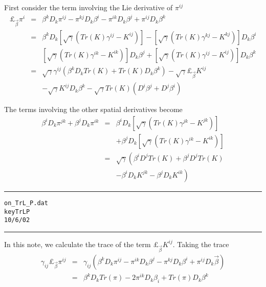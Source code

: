 \documentclass[12pt]{article}
\begin{document}
First consider the term involving the Lie derivative of $ {\pi}^{i j} $
\begin{eqnarray}\label{DxP1_1}
\pounds_{{\vec \beta}} {\pi}^{i }
& = &
{\beta}^{k} D_{k} {\pi}^{i j} - {\pi}^{k j} D_{k} {\beta}^{i}
- {\pi}^{i k} D_{k} {\beta}^{j} + {\pi}^{i j} D_{k} {\beta}^{k} \nonumber \\
& = &
{\beta}^{k} D_{k} \left[ \sqrt{\gamma} \left( Tr( K ) {\gamma}^{i j} - {K}^{i j} \right) \right]
- \left[ \sqrt{\gamma} \left( Tr( K ) {\gamma}^{k j} - {K}^{k j} \right) \right] D_{k} {\beta}^{i} \nonumber \\
&   &
\left[ \sqrt{\gamma} \left( Tr( K ) {\gamma}^{i k} - {K}^{i k} \right) \right] D_{k} {\beta}^{j}
+ \left[ \sqrt{\gamma} \left( Tr( K ) {\gamma}^{i j} - {K}^{i j} \right) \right] D_{k} {\beta}^{k} \nonumber \\
& = &
\sqrt{\gamma} {\gamma}^{i j} \left( {\beta}^{k} D_{k} Tr( K ) + Tr( K ) D_{k} {\beta}^{k} \right)
- \sqrt{\gamma} \pounds_{{\vec \beta}} {K}^{i j} \nonumber \\
&   &
- \sqrt{\gamma} {K}^{i j} D_{k} {\beta}^{k}
- \sqrt{\gamma} Tr( K ) \left( D^{i} {\beta}^{j} + D^{j} {\beta}^{i} \right)
\end{eqnarray}

The terms involving the other spatial derivatives become
\begin{eqnarray}\label{DxP1_2}
{\beta}^{i} D_{k} {\pi}^{j k} + {\beta}^{j} D_{k} {\pi}^{i k}
& = &
{\beta}^{i} D_{k} \left[ \sqrt{\gamma} \left( Tr( K ) {\gamma}^{j k} - {K}^{j k} \right) \right] \nonumber \\
&   &
+ {\beta}^{j} D_{k} \left[ \sqrt{\gamma} \left( Tr( K ) {\gamma}^{i k} - {K}^{i k} \right) \right] \nonumber \\
& = &
\sqrt{\gamma} \left( {\beta}^{i} D^{j} Tr( K ) + {\beta}^{j} D^{j} Tr( K ) \right. \nonumber \\
&   &
- \left. {\beta}^{i} D_{k} {K}^{j k} - {\beta}^{j} D_{k} {K}^{i k} \right)
\end{eqnarray}
\clearpage
\vspace{5mm}
\hrule
\begin{alltt}
  on_TrL_P.dat
  key TrLP
  10/6/02
\end{alltt}
\hrule
\vspace{5mm}

In this note, we calculate the trace of the term $ \pounds_{{\vec \beta}} {K}^{i j} $.
Taking the trace
\begin{eqnarray}\label{TrLP_1}
{\gamma}_{i j} \pounds_{{\vec \beta}} {\pi}^{i j}
& = &
{\gamma}_{i j} \left( {\beta}^{k} D_{k} {\pi}^{i j} - {\pi}^{i k} D_{k} {\beta}^{j}
- {\pi}^{k j} D_{k} {\beta}^{i} + {\pi}^{i j} D_{k} {\vec \beta} \right) \nonumber \\
& = &
{\beta}^{k} D_{k} Tr( \pi ) - 2 {\pi}^{i k} D_{k} {\beta}_{i}
+ Tr( \pi ) D_{k} {\beta}^{k}
\end{eqnarray}
\end{document}
